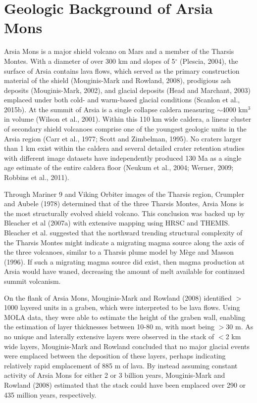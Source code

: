 \documentclass[12pt,letter]{article}
\begin{document}
\section{Geologic Background of Arsia Mons}

Arsia Mons is a major shield volcano on Mars and a member of the Tharsis Montes. With a diameter of over 300 km and slopes of 5$^{\circ}$ (Plescia, 2004), the surface of Arsia contains lava flows, which served as the primary construction material of the shield (Mouginis-Mark and Rowland, 2008), prodigious ash deposits (Mouginis-Mark, 2002), and glacial deposits (Head and Marchant, 2003) emplaced under both cold- and warm-based glacial conditions (Scanlon et al., 2015b). At the summit of Arsia is a single collapse caldera measuring $\sim$4000 km$^3$ in volume (Wilson et al., 2001). Within this 110 km wide caldera, a linear cluster of secondary shield volcanoes comprise one of the youngest geologic units in the Arsia region (Carr et al., 1977; Scott and Zimbelman, 1995). No craters larger than 1 km exist within the caldera and several detailed crater retention studies with different image datasets have independently produced 130 Ma as a single age estimate of the entire caldera floor (Neukum et al., 2004; Werner, 2009; Robbins et al., 2011).

Through Mariner 9 and Viking Orbiter images of the Tharsis region, Crumpler and Aubele (1978) determined that of the three Tharsis Montes, Arsia Mons is the most structurally evolved shield volcano. This conclusion was backed up by Bleacher et al (2007a) with extensive mapping using HRSC and THEMIS. Bleacher et al. suggested that the northward trending structural complexity of the Tharsis Montes might indicate a migrating magma source along the axis of the three volcanoes, similar to a Tharsis plume model by Mège and Masson (1996). If such a migrating magma source did exist, then magma production at Arsia would have waned, decreasing the amount of melt available for continued summit volcanism.

On the flank of Arsia Mons, Mouginis-Mark and Rowland (2008) identified $>$1000 layered units in a graben, which were interpreted to be lava flows. Using MOLA data, they were able to estimate the height of the graben wall, enabling the estimation of layer thicknesses between 10-80 m, with most being $>$30 m. As no unique and laterally extensive layers were observed in the stack of $<$2 km wide layers, Mouginis-Mark and Rowland concluded that no major glacial events were emplaced between the deposition of these layers, perhaps indicating relatively rapid emplacement of 885 m of lava. By instead assuming constant activity of Arsia Mons for either 2 or 3 billion years, Mouginis-Mark and Rowland (2008) estimated that the stack could have been emplaced over 290 or 435 million years, respectively. 
\end{document}
